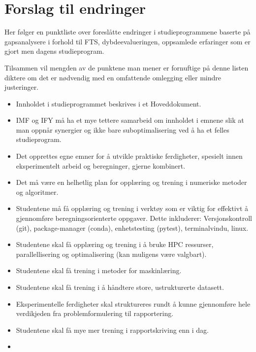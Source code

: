 \section{Forslag til endringer}

Her følger en punktliste over foreslåtte endringer i studieprogrammene baserte på gapsanalysere i forhold til FTS, dybdeevalueringen, oppsamlede erfaringer som er gjort men dagens studieprogram.

Tilsammen vil mengden av de punktene man mener er fornuftige på denne listen diktere om det er nødvendig med en omfattende omlegging eller mindre justeringer.

\begin{itemize}
	\item Innholdet i studieprogrammet beskrives i et Hoveddokument.
	\item IMF og IFY må ha et mye tettere samarbeid om innholdet i emnene slik at man oppnår synergier og ikke bare suboptimalisering ved å ha et felles studieprogram.
	\item Det opprettes egne emner for å utvikle praktiske ferdigheter, spesielt innen eksperimentelt arbeid og beregninger, gjerne kombinert.
	\item Det må være en helhetlig plan for opplæring og trening i numeriske metoder og algoritmer.
	\item Studentene må få opplæring og trening i verktøy som er viktig for effektivt å gjennomføre beregningsorienterte oppgaver. Dette inkluderer: Versjonskontroll (git), package-manager (conda), enhetstesting (pytest), terminalvindu, linux.
	\item Studentene skal få opplæring og trening i å bruke HPC ressurser, parallellisering og optimalisering (kan muligens være valgbart). 
	\item Studentene skal få trening i metoder for maskinlæring. 
	\item Studentene skal få trening i å håndtere store, ustrukturerte datasett.
	\item Eksperimentelle ferdigheter skal struktureres rundt å kunne gjennomføre hele verdikjeden fra problemformulering til rapportering.
	\item Studentene skal få mye mer trening i rapportskriving enn i dag.
	\item 
\end{itemize}